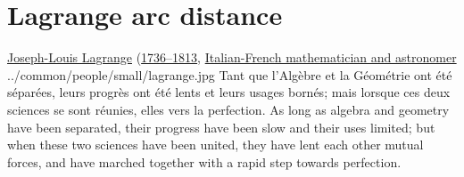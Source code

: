 
\chapter{Lagrange arc distance}
\label{app:larc}
\qboxnpqt
  { \href{http://en.wikipedia.org/wiki/Joseph_Louis_Lagrange}{Joseph-Louis Lagrange}
    (\href{http://www-history.mcs.st-andrews.ac.uk/Timelines/TimelineD.html}{1736--1813},
     \href{http://www-history.mcs.st-andrews.ac.uk/BirthplaceMaps/Places/Italy.html}{Italian-French mathematician and astronomer}
    \footnotemark
  }
  {../common/people/small/lagrange.jpg}
  {Tant que l'Alg\`ebre et la G\'eom\'etrie ont \'et\'e s\'epar\'ees,
   leurs progr\`es ont \'et\'e lents et leurs usages born\'es;
   mais lorsque ces deux sciences se sont r\'eunies, elles vers la perfection.}
  {As long as algebra and geometry have been separated,
   their progress have been slow and their uses limited;
   but when these two sciences have been united, they have lent each other mutual forces,
   and have marched together with a rapid step towards perfection.
  }

